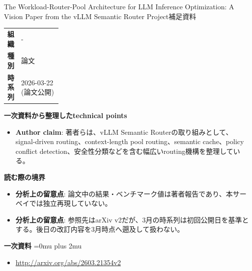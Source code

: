 \begin{technicalnote}{The Workload-Router-Pool Architecture for LLM Inference Optimization: A Vision Paper from the vLLM Semantic Router Project}{補足資料}
\begingroup
\begin{tabularx}{\linewidth}{@{}>{\bfseries}p{0.22\linewidth}X@{}}
組織 & - \\
種別 & 論文 \\
時系列 & 2026-03-22 (論文公開) \\
\end{tabularx}
\smallskip
{\bfseries 一次資料から整理したtechnical points}
\begin{itemize}[leftmargin=1.5em,itemsep=0.35em]
\item \textbf{Author claim}: 著者らは、vLLM Semantic Routerの取り組みとして、signal-driven routing、context-length pool routing、semantic cache、policy conflict detection、安全性分類などを含む幅広いrouting機構を整理している。
\end{itemize}
\begin{minipage}{\linewidth}
{\bfseries 読む際の境界}
\begin{itemize}[leftmargin=1.5em,itemsep=0.35em]
\item \textbf{分析上の留意点}: 論文中の結果・ベンチマーク値は著者報告であり、本サーベイでは独立再現していない。
\item \textbf{分析上の留意点}: 参照先はarXiv v2だが、3月の時系列は初回公開日を基準とする。後日の改訂内容を3月時点へ遡及して扱わない。
\end{itemize}
\begin{samepage}
{\bfseries 一次資料}
\begingroup\sloppy
\Urlmuskip=0mu plus 2mu\relax
\begin{itemize}[leftmargin=1.5em,itemsep=0.25em]
\item {\scriptsize\url{http://arxiv.org/abs/2603.21354v2}}
\end{itemize}
\endgroup
\end{samepage}
\end{minipage}
\endgroup
\end{technicalnote}
\medskip

